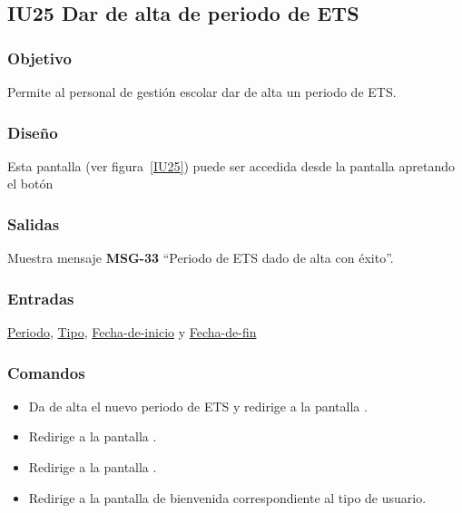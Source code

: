 
\subsection{IU25 Dar de alta de periodo de ETS}
\subsubsection{Objetivo}
    Permite al personal de gestión escolar dar de alta un periodo de ETS.
\subsubsection{Diseño}
    Esta pantalla  (ver figura~\ref{IU25}) puede ser accedida desde la pantalla  apretando el botón 

\subsubsection{Salidas}
Muestra mensaje {\bf MSG-33} ``Periodo de ETS  dado de alta con éxito''.
\subsubsection{Entradas}
\hyperlink{Periodo de ETS.Periodo}{Periodo}, \hyperlink{Periodo-de-ETS.Tipo}{Tipo}, \hyperlink{Periodo-de-ETS.Fecha-de-inicio}{Fecha-de-inicio} y \hyperlink{Periodo-de-ETS.Fecha-de-fin}{Fecha-de-fin}
\subsubsection{Comandos}
\begin{itemize}
    \item {} Da de alta el nuevo periodo de ETS y redirige a la pantalla .
    \item {} Redirige a la pantalla .
    \item {} Redirige a la pantalla .
    \item {} Redirige a la pantalla de bienvenida correspondiente al tipo de usuario.
    
\end{itemize}


